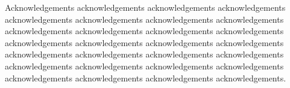 Acknowledgements acknowledgements acknowledgements acknowledgements
acknowledgements acknowledgements acknowledgements acknowledgements
acknowledgements acknowledgements acknowledgements acknowledgements
acknowledgements acknowledgements acknowledgements acknowledgements
acknowledgements acknowledgements acknowledgements acknowledgements
acknowledgements acknowledgements acknowledgements acknowledgements
acknowledgements acknowledgements acknowledgements acknowledgements.

